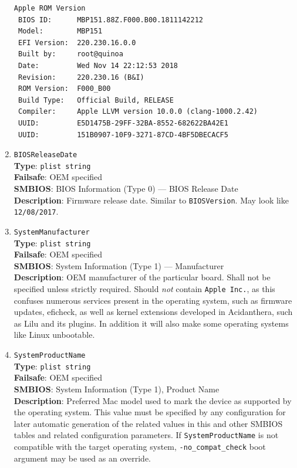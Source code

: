 \documentclass[]{article}
\begin{document}
\begin{enumerate}
\begin{verbatim}
Apple ROM Version
 BIOS ID:      MBP151.88Z.F000.B00.1811142212
 Model:        MBP151
 EFI Version:  220.230.16.0.0
 Built by:     root@quinoa
 Date:         Wed Nov 14 22:12:53 2018
 Revision:     220.230.16 (B&I)
 ROM Version:  F000_B00
 Build Type:   Official Build, RELEASE
 Compiler:     Apple LLVM version 10.0.0 (clang-1000.2.42)
 UUID:         E5D1475B-29FF-32BA-8552-682622BA42E1
 UUID:         151B0907-10F9-3271-87CD-4BF5DBECACF5
\end{verbatim}
\item
  \texttt{BIOSReleaseDate}\\
  \textbf{Type}: \texttt{plist\ string}\\
  \textbf{Failsafe}: OEM specified\\
  \textbf{SMBIOS}: BIOS Information (Type 0) --- BIOS Release Date\\
  \textbf{Description}: Firmware release date. Similar to
  \texttt{BIOSVersion}. May look like \texttt{12/08/2017}.
\item
  \texttt{SystemManufacturer}\\
  \textbf{Type}: \texttt{plist\ string}\\
  \textbf{Failsafe}: OEM specified\\
  \textbf{SMBIOS}: System Information (Type 1) --- Manufacturer\\
  \textbf{Description}: OEM manufacturer of the particular board. Shall
  not be specified unless strictly required. Should \emph{not} contain
  \texttt{Apple\ Inc.}, as this confuses numerous services present in
  the operating system, such as firmware updates, eficheck, as well as
  kernel extensions developed in Acidanthera, such as Lilu and its
  plugins. In addition it will also make some operating systems
  like Linux unbootable.
\item
  \texttt{SystemProductName}\\
  \textbf{Type}: \texttt{plist\ string}\\
  \textbf{Failsafe}: OEM specified\\
  \textbf{SMBIOS}: System Information (Type 1), Product Name\\
  \textbf{Description}: Preferred Mac model used to mark the device as
  supported by the operating system. This value must be specified by any
  configuration for later automatic generation of the related values in
  this and other SMBIOS tables and related configuration parameters. If
  \texttt{SystemProductName} is not compatible with the target operating
  system, \texttt{-no\_compat\_check} boot argument may be used as an
  override.


\end{enumerate}
\end{document}

